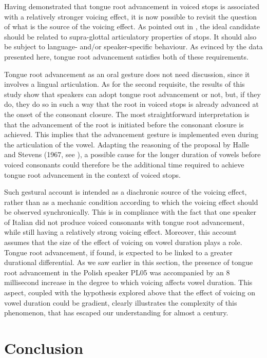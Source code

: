 \documentclass[authoryear, twocolumn]{elsarticle}
\begin{document}
Having demonstrated that tongue root advancement in voiced stops is
associated with a relatively stronger voicing effect, it is now possible
to revisit the question of what is the source of the voicing effect. As
pointed out in , the ideal candidate should be related to
supra-glottal articulatory properties of stops. It should also be
subject to language- and/or speaker-specific behaviour. As evinced by
the data presented here, tongue root advancement satisfies both of these
requirements.

Tongue root advancement as an oral gesture does not need discussion,
since it involves a lingual articulation. As for the second requisite,
the results of this study show that speakers can adopt tongue root
advancement or not, but, if they do, they do so in such a way that the
root in voiced stops is already advanced at the onset of the consonant
closure. The most straightforward interpretation is that the advancement
of the root is initiated before the consonant closure is achieved. This
implies that the advancement gesture is implemented even during the
articulation of the vowel. Adapting the reasoning of the proposal by
Halle and Stevens (1967, see ), a possible cause for the
longer duration of vowels before voiced consonants could therefore be
the additional time required to achieve tongue root advancement in the
context of voiced stops.

Such gestural account is intended as a diachronic source of the voicing
effect, rather than as a mechanic condition according to which the
voicing effect should be observed synchronically. This is in compliance
with the fact that one speaker of Italian did not produce voiced
consonants with tongue root advancement, while still having a relatively
strong voicing effect. Moreover, this account assumes that the size of
the effect of voicing on vowel duration plays a role. Tongue root
advancement, if found, is expected to be linked to a greater durational
differential. As we saw earlier in this section, the presence of tongue
root advancement in the Polish speaker PL05 was accompanied by an 8
millisecond increase in the degree to which voicing affects vowel
duration. This aspect, coupled with the hypothesis explored above that
the effect of voicing on vowel duration could be gradient, clearly
illustrates the complexity of this phenomenon, that has escaped our
understanding for almost a century.

\section{Conclusion}\label{conclusion}
\end{document}
